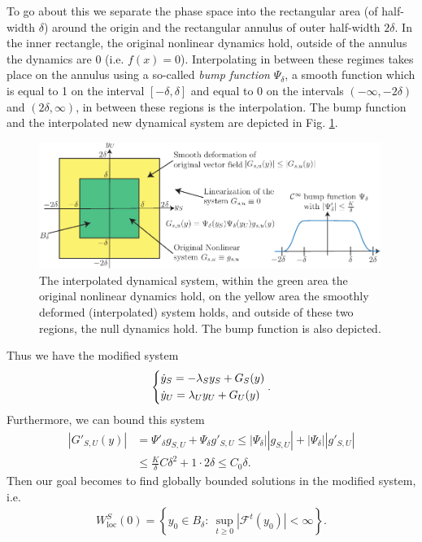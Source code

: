 \begin{enumerate}
	To go about this we separate the phase space into the rectangular area (of half-width $\delta$) around the origin and the rectangular annulus of outer half-width $2\delta$. In the inner rectangle, the original nonlinear dynamics hold, outside of the annulus the dynamics are 0 (i.e. $f(x)=0$). Interpolating in between these regimes takes place on the annulus using a so-called \emph{bump function} $\Psi_{\delta}$, a smooth function which is equal to 1 on the interval $[-\delta, \delta]$ and equal to 0 on the intervals $(-\infty, -2\delta)$ and $(2\delta, \infty )$, in between these regions is the interpolation. The bump function and the interpolated new dynamical system are depicted in Fig. \ref{fig:interpolated_DS}.
\begin{figure}[h!]
	\centering
	\includegraphics[width=0.99\textwidth]{figures/ch9/24_5interpolated_DS.pdf}
	\caption{The interpolated dynamical system, within the green area the original nonlinear dynamics hold, on the yellow area the smoothly deformed (interpolated) system holds, and outside of these two regions, the null dynamics hold. The bump function is also depicted.}
	\label{fig:interpolated_DS}
\end{figure}

Thus we have the modified system
\begin{align}
	\begin{dcases}
		\dot{y}_{S} = - \lambda_{S}y_{S} + G_{S}(y) \\
		\dot{y}_{U} = \lambda _{U} y_U + G_{U}(y)
	\end{dcases}
	.
\end{align}
Furthermore, we can bound this system
	\begin{subequations}
		\begin{align}
			|G'_{S,U}(y) | &= \Psi'_{\delta}g_{S,U} + \Psi_{\delta} g'_{S,U} \leq |\Psi_{\delta}| | g_{S,U}| + |\Psi_{\delta}| |g'_{S,U}|\\
				       &\leq \frac{K}{\delta} C \delta^2 + 1\cdot2\delta \leq C_0 \delta.	
		\end{align}
	\end{subequations}
	Then our goal becomes to find globally bounded solutions in the modified system, i.e.
	\begin{align}
		W^{S}_{ \textrm{loc} }(0) = \left\{ y_0 \in B_{\delta}:\ \sup_{t \geq 0}\left|\mathcal{F}^{t}(y_0) \right| < \infty \right\}.
	\end{align}


\end{enumerate}
